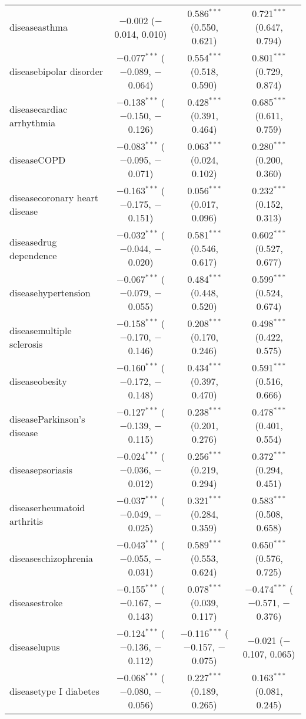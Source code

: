 \begin{table}[!htbp]
\begin{tabular}{@{\extracolsep{5pt}}lccc}
  diseaseasthma & $-$0.002 ($-$0.014, 0.010) & 0.586$^{***}$ (0.550, 0.621) & 0.721$^{***}$ (0.647, 0.794) \\ 
  diseasebipolar disorder & $-$0.077$^{***}$ ($-$0.089, $-$0.064) & 0.554$^{***}$ (0.518, 0.590) & 0.801$^{***}$ (0.729, 0.874) \\ 
  diseasecardiac arrhythmia & $-$0.138$^{***}$ ($-$0.150, $-$0.126) & 0.428$^{***}$ (0.391, 0.464) & 0.685$^{***}$ (0.611, 0.759) \\ 
  diseaseCOPD & $-$0.083$^{***}$ ($-$0.095, $-$0.071) & 0.063$^{***}$ (0.024, 0.102) & 0.280$^{***}$ (0.200, 0.360) \\ 
  diseasecoronary heart disease & $-$0.163$^{***}$ ($-$0.175, $-$0.151) & 0.056$^{***}$ (0.017, 0.096) & 0.232$^{***}$ (0.152, 0.313) \\ 
  diseasedrug dependence & $-$0.032$^{***}$ ($-$0.044, $-$0.020) & 0.581$^{***}$ (0.546, 0.617) & 0.602$^{***}$ (0.527, 0.677) \\ 
  diseasehypertension & $-$0.067$^{***}$ ($-$0.079, $-$0.055) & 0.484$^{***}$ (0.448, 0.520) & 0.599$^{***}$ (0.524, 0.674) \\ 
  diseasemultiple sclerosis & $-$0.158$^{***}$ ($-$0.170, $-$0.146) & 0.208$^{***}$ (0.170, 0.246) & 0.498$^{***}$ (0.422, 0.575) \\ 
  diseaseobesity & $-$0.160$^{***}$ ($-$0.172, $-$0.148) & 0.434$^{***}$ (0.397, 0.470) & 0.591$^{***}$ (0.516, 0.666) \\ 
  diseaseParkinson's disease & $-$0.127$^{***}$ ($-$0.139, $-$0.115) & 0.238$^{***}$ (0.201, 0.276) & 0.478$^{***}$ (0.401, 0.554) \\ 
  diseasepsoriasis & $-$0.024$^{***}$ ($-$0.036, $-$0.012) & 0.256$^{***}$ (0.219, 0.294) & 0.372$^{***}$ (0.294, 0.451) \\ 
  diseaserheumatoid arthritis & $-$0.037$^{***}$ ($-$0.049, $-$0.025) & 0.321$^{***}$ (0.284, 0.359) & 0.583$^{***}$ (0.508, 0.658) \\ 
  diseaseschizophrenia & $-$0.043$^{***}$ ($-$0.055, $-$0.031) & 0.589$^{***}$ (0.553, 0.624) & 0.650$^{***}$ (0.576, 0.725) \\ 
  diseasestroke & $-$0.155$^{***}$ ($-$0.167, $-$0.143) & 0.078$^{***}$ (0.039, 0.117) & $-$0.474$^{***}$ ($-$0.571, $-$0.376) \\ 
  diseaselupus & $-$0.124$^{***}$ ($-$0.136, $-$0.112) & $-$0.116$^{***}$ ($-$0.157, $-$0.075) & $-$0.021 ($-$0.107, 0.065) \\ 
  diseasetype I diabetes & $-$0.068$^{***}$ ($-$0.080, $-$0.056) & 0.227$^{***}$ (0.189, 0.265) & 0.163$^{***}$ (0.081, 0.245) \\ 

\end{tabular}
\end{table}
